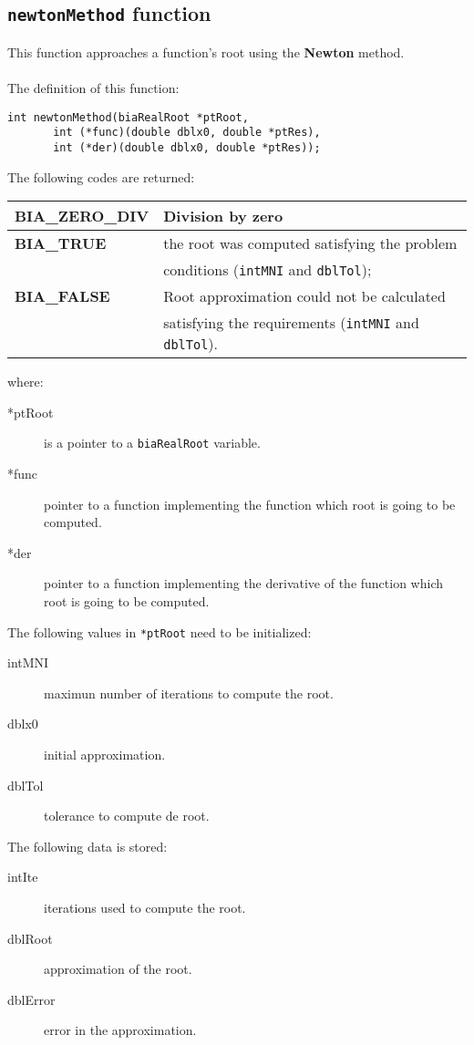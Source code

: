 \subsection{\texttt{newtonMethod} function}

This function approaches a function's root using the \textbf{Newton} method.\\ \\
%
The definition of this function:
%
\begin{verbatim}
int newtonMethod(biaRealRoot *ptRoot, 
       int (*func)(double dblx0, double *ptRes),
       int (*der)(double dblx0, double *ptRes));  
\end{verbatim}
%
The following codes are returned:
%
\begin{center}
\begin{tabular}{|l|l|}
\hline
\textbf{BIA\_ZERO\_DIV} & Division by zero \\
\hline
\textbf{BIA\_TRUE} & the root was computed satisfying the problem \\
                   & conditions (\texttt{intMNI} and \texttt{dblTol}); \\
\hline
\textbf{BIA\_FALSE} & Root approximation could not be calculated \\
                    & satisfying the requirements (\texttt{intMNI} and \texttt{dblTol}). \\
\hline
\end{tabular}
\end{center}
%
where:
%
\begin{description}
\item[*ptRoot] is a pointer to a \texttt{biaRealRoot} variable.
\item[*func] pointer to a function implementing the function which root is going to be computed.
\item[*der] pointer to a function implementing the derivative of the function which root is going to be computed.
\end{description}
%
The following values in \texttt{*ptRoot} need to be initialized:
%
\begin{description}
\item[intMNI] maximun number of iterations to compute the root.
\item[dblx0] initial approximation.
\item[dblTol] tolerance to compute de root.
\end{description}
%
The following data is stored:
%
\begin{description}
\item[intIte] iterations used to compute the root.
\item[dblRoot] approximation of the root.
\item[dblError] error in the approximation.
\end{description}
%
